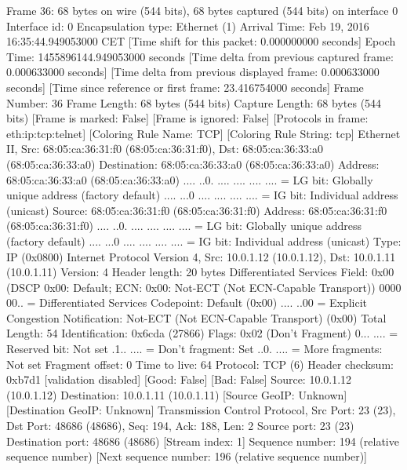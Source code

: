 Frame 36: 68 bytes on wire (544 bits), 68 bytes captured (544 bits) on interface 0
    Interface id: 0
    Encapsulation type: Ethernet (1)
    Arrival Time: Feb 19, 2016 16:35:44.949053000 CET
    [Time shift for this packet: 0.000000000 seconds]
    Epoch Time: 1455896144.949053000 seconds
    [Time delta from previous captured frame: 0.000633000 seconds]
    [Time delta from previous displayed frame: 0.000633000 seconds]
    [Time since reference or first frame: 23.416754000 seconds]
    Frame Number: 36
    Frame Length: 68 bytes (544 bits)
    Capture Length: 68 bytes (544 bits)
    [Frame is marked: False]
    [Frame is ignored: False]
    [Protocols in frame: eth:ip:tcp:telnet]
    [Coloring Rule Name: TCP]
    [Coloring Rule String: tcp]
Ethernet II, Src: 68:05:ca:36:31:f0 (68:05:ca:36:31:f0), Dst: 68:05:ca:36:33:a0 (68:05:ca:36:33:a0)
    Destination: 68:05:ca:36:33:a0 (68:05:ca:36:33:a0)
        Address: 68:05:ca:36:33:a0 (68:05:ca:36:33:a0)
        .... ..0. .... .... .... .... = LG bit: Globally unique address (factory default)
        .... ...0 .... .... .... .... = IG bit: Individual address (unicast)
    Source: 68:05:ca:36:31:f0 (68:05:ca:36:31:f0)
        Address: 68:05:ca:36:31:f0 (68:05:ca:36:31:f0)
        .... ..0. .... .... .... .... = LG bit: Globally unique address (factory default)
        .... ...0 .... .... .... .... = IG bit: Individual address (unicast)
    Type: IP (0x0800)
Internet Protocol Version 4, Src: 10.0.1.12 (10.0.1.12), Dst: 10.0.1.11 (10.0.1.11)
    Version: 4
    Header length: 20 bytes
    Differentiated Services Field: 0x00 (DSCP 0x00: Default; ECN: 0x00: Not-ECT (Not ECN-Capable Transport))
        0000 00.. = Differentiated Services Codepoint: Default (0x00)
        .... ..00 = Explicit Congestion Notification: Not-ECT (Not ECN-Capable Transport) (0x00)
    Total Length: 54
    Identification: 0x6cda (27866)
    Flags: 0x02 (Don't Fragment)
        0... .... = Reserved bit: Not set
        .1.. .... = Don't fragment: Set
        ..0. .... = More fragments: Not set
    Fragment offset: 0
    Time to live: 64
    Protocol: TCP (6)
    Header checksum: 0xb7d1 [validation disabled]
        [Good: False]
        [Bad: False]
    Source: 10.0.1.12 (10.0.1.12)
    Destination: 10.0.1.11 (10.0.1.11)
    [Source GeoIP: Unknown]
    [Destination GeoIP: Unknown]
Transmission Control Protocol, Src Port: 23 (23), Dst Port: 48686 (48686), Seq: 194, Ack: 188, Len: 2
    Source port: 23 (23)
    Destination port: 48686 (48686)
    [Stream index: 1]
    Sequence number: 194    (relative sequence number)
    [Next sequence number: 196    (relative sequence number)]
